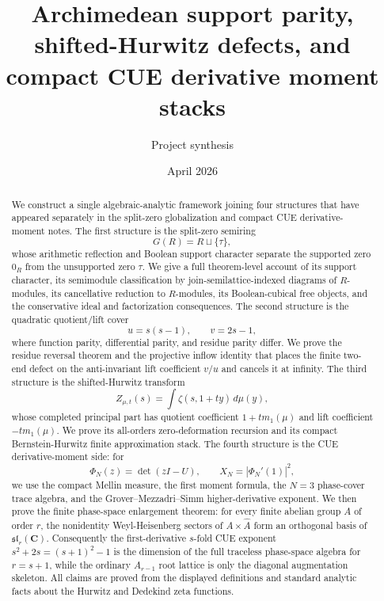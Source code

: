 \documentclass[11pt]{article}
\title{Archimedean support parity, shifted-Hurwitz defects, and compact CUE derivative moment stacks}
\author{Project synthesis}
\date{April 2026}
\newcommand{\C}{\mathbf C}
\newcommand{\1}{\mathbf 1}
\numberwithin{equation}{section}
\begin{document}
\maketitle

\begin{abstract}
We construct a single algebraic-analytic framework joining four structures that have appeared separately in the split-zero globalization and compact CUE derivative-moment notes.  The first structure is the split-zero semiring
\[
  G(R)=R\sqcup\{\tau\},
\]
whose arithmetic reflection and Boolean support character separate the supported zero $0_R$ from the unsupported zero $\tau$.  We give a full theorem-level account of its support character, its semimodule classification by join-semilattice-indexed diagrams of $R$-modules, its cancellative reduction to $R$-modules, its Boolean-cubical free objects, and the conservative ideal and factorization consequences.  The second structure is the quadratic quotient/lift cover
\[
  u=s(s-1),\qquad v=2s-1,
\]
where function parity, differential parity, and residue parity differ.  We prove the residue reversal theorem and the projective inflow identity that places the finite two-end defect on the anti-invariant lift coefficient $v/u$ and cancels it at infinity.  The third structure is the shifted-Hurwitz transform
\[
  Z_{\mu,t}(s)=\int \zeta(s,1+ty)\,d\mu(y),
\]
whose completed principal part has quotient coefficient $1+t m_1(\mu)$ and lift coefficient $-t m_1(\mu)$.  We prove its all-orders zero-deformation recursion and its compact Bernstein-Hurwitz finite approximation stack.  The fourth structure is the CUE derivative-moment side: for
\[
  \Phi_N(z)=\det(zI-U),\qquad X_N=|\Phi_N'(1)|^2,
\]
we use the compact Mellin measure, the first moment formula, the $N=3$ phase-cover trace algebra, and the Grover--Mezzadri--Simm higher-derivative exponent.  We then prove the finite phase-space enlargement theorem: for every finite abelian group $A$ of order $r$, the nonidentity Weyl-Heisenberg sectors of $A\times\widehat A$ form an orthogonal basis of $\mathfrak{sl}_r(\C)$.  Consequently the first-derivative $s$-fold CUE exponent $s^2+2s=(s+1)^2-1$ is the dimension of the full traceless phase-space algebra for $r=s+1$, while the ordinary $A_{r-1}$ root lattice is only the diagonal augmentation skeleton.  All claims are proved from the displayed definitions and standard analytic facts about the Hurwitz and Dedekind zeta functions.
\end{abstract}

\tableofcontents
\end{document}
